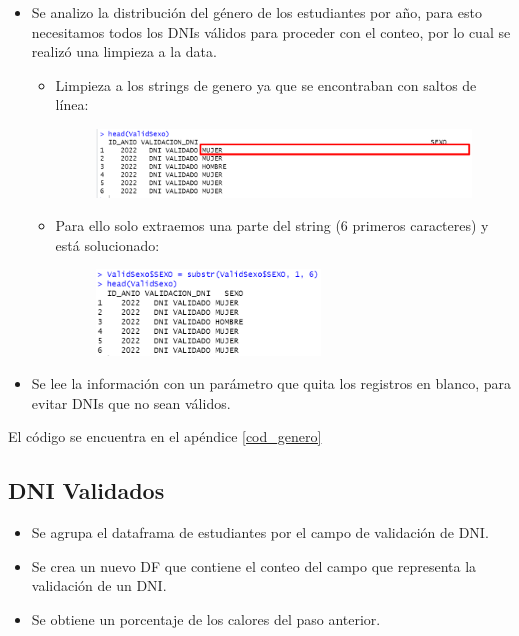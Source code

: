 \begin{itemize}
    \item Se analizo la distribución del género de los estudiantes por año, para esto necesitamos todos los DNIs válidos para proceder con el conteo, por lo cual se realizó una limpieza a la data.
    \begin{itemize}
        \item Limpieza a los strings de genero ya que se encontraban con saltos de línea:
        \begin{figure}[th]
        \centering
        \includegraphics[width=1\textwidth]{Figures/genero1}
        \decoRule
        \caption[]{}
        \label{fig:genero1}
        \end{figure}
        \item Para ello solo extraemos una parte del string (6 primeros caracteres) y está solucionado:
        \begin{figure}[th]
        \centering
        \includegraphics[width=0.6\textwidth]{Figures/genero2}
        \decoRule
        \caption[]{}
        \label{fig:genero2}
        \end{figure}
    \end{itemize}
    \item Se lee la información con un parámetro que quita los registros en blanco, para evitar DNIs que no sean válidos.
\end{itemize}

El código se encuentra en el apéndice \ref{cod_genero}

\subsection{DNI Validados}

\begin{itemize}
    \item Se agrupa el dataframa de estudiantes por el campo de validación de DNI.
    \item Se crea un nuevo DF que contiene el conteo del campo que representa la validación de un DNI.
    \item Se obtiene un porcentaje de los calores del paso anterior.
\end{itemize}

